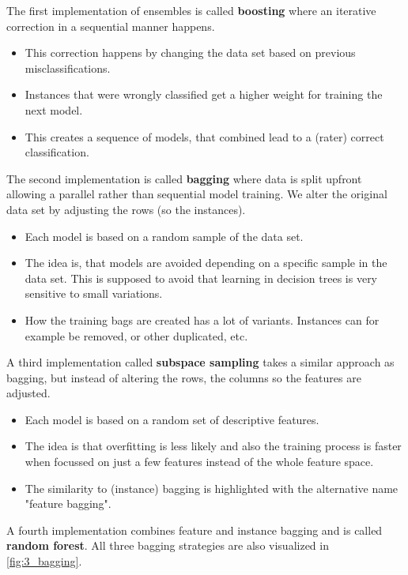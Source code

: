 The first implementation of ensembles is called \textbf{boosting} where an iterative correction in a sequential manner happens. 
\begin{itemize}
  \item This correction happens by changing the data set based on previous misclassifications.
  \item Instances that were wrongly classified get a higher weight for training the next model.
  \item This creates a sequence of models, that combined lead to a (rater) correct classification.
\end{itemize}

The second implementation is called \textbf{bagging} where data is split upfront allowing a parallel rather than sequential model training. We alter the original data set by adjusting the rows (so the instances).
\begin{itemize}
  \item Each model is based on a random sample of the data set.
  \item The idea is, that models are avoided depending on a specific sample in the data set. This is supposed to avoid that learning in decision trees is very sensitive to small variations.
  \item How the training bags are created has a lot of variants. Instances can for example be removed, or other duplicated, etc.
\end{itemize}

A third implementation called \textbf{subspace sampling} takes a similar approach as bagging, but instead of altering the rows, the columns so the features are adjusted.
\begin{itemize}
  \item Each model is based on a random set of descriptive features.
  \item The idea is that overfitting is less likely and also the training process is faster when focussed on just a few features instead of the whole feature space.
  \item The similarity to (instance) bagging is highlighted with the alternative name "feature bagging".
\end{itemize}

A fourth implementation combines feature and instance bagging and is called \textbf{random forest}. All three bagging strategies are also visualized in \ref{fig:3_bagging}.

